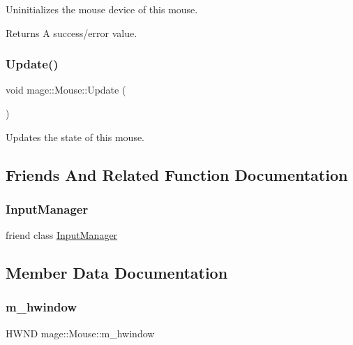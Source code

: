 Uninitializes the mouse device of this mouse.

\begin{DoxyReturn}{Returns}
A success/error value. 
\end{DoxyReturn}
\hypertarget{classmage_1_1_mouse_a0cddae3f871dd69c1ba6928dc6b1f985}{}\label{classmage_1_1_mouse_a0cddae3f871dd69c1ba6928dc6b1f985} 
\subsubsection{\texorpdfstring{Update()}{Update()}}
{\footnotesize\ttfamily void mage\+::\+Mouse\+::\+Update (\begin{DoxyParamCaption}{ }\end{DoxyParamCaption})\hspace{0.3cm}{\ttfamily [protected]}}

Updates the state of this mouse. 

\subsection{Friends And Related Function Documentation}
\hypertarget{classmage_1_1_mouse_af0e8c3dcc20b7ddcaf63506363a22821}{}\label{classmage_1_1_mouse_af0e8c3dcc20b7ddcaf63506363a22821} 
\subsubsection{\texorpdfstring{Input\+Manager}{InputManager}}
{\footnotesize\ttfamily friend class \hyperlink{classmage_1_1_input_manager}{Input\+Manager}\hspace{0.3cm}{\ttfamily [friend]}}



\subsection{Member Data Documentation}
\hypertarget{classmage_1_1_mouse_a0c67906df7b8b0cce013c724be4625ac}{}\label{classmage_1_1_mouse_a0c67906df7b8b0cce013c724be4625ac} 
\subsubsection{\texorpdfstring{m\+\_\+hwindow}{m\_hwindow}}
{\footnotesize\ttfamily H\+W\+ND mage\+::\+Mouse\+::m\+\_\+hwindow\hspace{0.3cm}{\ttfamily [protected]}}

